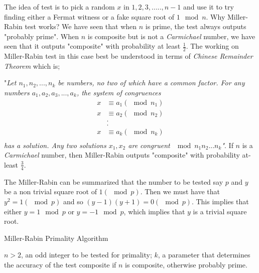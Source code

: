 \documentclass[12pt,journal,compsoc]{IEEEtran}
\begin{document}
The idea of test is to pick a random $x$ in ${1,2,3,.....,n-1}$ and use it to try finding either a Fermat witness\cite{fermat} or a fake square root of $1 \mod n$. Why Miller-Rabin test works? We have seen that when $n$ is prime, the test always outputs "probably prime". When $n$ is composite but is not a \emph{Carmichael} number, we have seen that it outputs "composite" with probability at least $\frac{1}{2}$. The working on Miller-Rabin test in this case best be understood in terms of \emph{Chinese Remainder Theorem}\cite{chinese_theorem} which is;


"\emph{Let $n_1, n_2,...,n_k$ be numbers, no two of which have a common factor. For any numbers $a_1, a_2, a_3,...,a_k$, the system of congruences }
\begin{align*}
x &\equiv a_1 (\mod n_1) \\
x &\equiv a_2 (\mod n_2) \\
&.\\
&.\\
x &\equiv a_k (\mod n_k) \\
\end{align*}
\emph{has a solution. Any two solutions $x_1, x_2$ are congruent $\mod n_1 n_2 ... n_k$"}. If $n$ is a \emph{Carmichael} number, then Miller-Rabin outputs "composite" with probability at-least $\frac{3}{4}$. %


The Miller-Rabin can be summarized that the number to be tested say $p$ and $y$ be a non trivial square root of $1 (\mod p)$.\cite{miller-rabin} Then we must have that $y^{2} = 1 (\mod p)$ and so $(y-1)(y+1) = 0(\mod p)$. This implies that either $y = 1 \mod p$ or $y = -1 \mod p$, which implies that $y$ is a trivial square root.


\begin{algorithm}                      %
\caption{Miller-Rabin Primality Algorithm}          %
\label{alg1}                           %
\begin{algorithmic}                    %
    \REQUIRE $n>2$, an odd integer to be tested for primality; $k$, a parameter that determines the accuracy of the test
    \ENSURE composite if $n$ is composite, otherwise probably prime.
    
   
   \REPEAT
	\ENDIF
		\ENDIF
		\ENDIF
	\ENDFOR
\end{algorithmic}
\end{algorithm}
\end{document}
